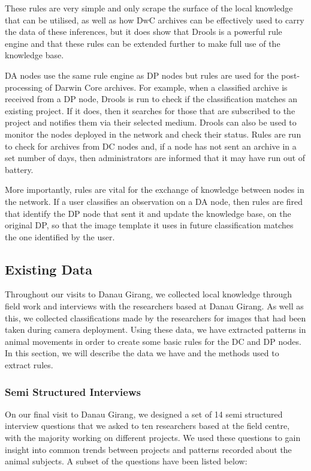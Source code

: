 		
		
		These rules are very simple and only scrape the surface of the local knowledge that can be utilised, as well as how DwC archives can be effectively used to carry the data of these inferences, but it does show that Drools is a powerful rule engine and that these rules can be extended further to make full use of the knowledge base. 
		
		DA nodes use the same rule engine as DP nodes but rules are used for the post-processing of Darwin Core archives. For example, when a classified archive is received from a DP node, Drools is run to check if the classification matches an existing project. If it does, then it searches for those that are subscribed to the project and notifies them via their selected medium. Drools can also be used to monitor the nodes deployed in the network and check their status. Rules are run to check for archives from DC nodes and, if a node has not sent an archive in a set number of days, then administrators are informed that it may have run out of battery.
		
		More importantly, rules are vital for the exchange of knowledge between nodes in the network. If a user classifies an observation on a DA node, then rules are fired that identify the DP node that sent it and update the knowledge base, on the original DP, so that the image template it uses in future classification matches the one identified by the user.
		
		\subsection{Existing Data}
			Throughout our visits to Danau Girang, we collected local knowledge through field work and interviews with the researchers based at Danau Girang. As well as this, we collected classifications made by the researchers for images that had been taken during camera deployment. Using these data, we have extracted patterns in animal movements in order to create some basic rules for the DC and DP nodes. In this section, we will describe the data we have and the methods used to extract rules.
			
			\subsubsection{Semi Structured Interviews}
			On our final visit to Danau Girang, we designed a set of 14 semi structured interview questions that we asked to ten researchers based at the field centre, with the majority working on different projects. We used these questions to gain insight into common trends between projects and patterns recorded about the animal subjects. A subset of the questions have been listed below:
			
